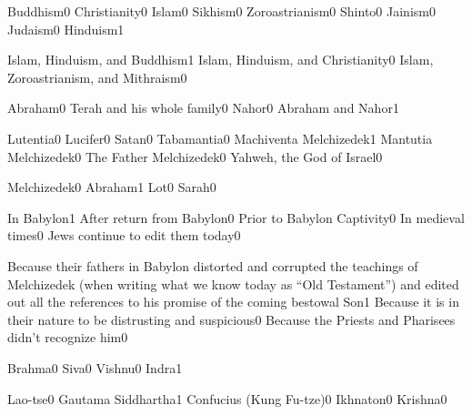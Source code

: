 {Buddhism}{0}
{Christianity}{0}
{Islam}{0}
{Sikhism}{0}
{Zoroastrianism}{0}
{Shinto}{0}
{Jainism}{0}
{Judaism}{0}
{Hinduism}{1}
\qstop

{Islam, Hinduism, and Buddhism}{1}
{Islam, Hinduism, and Christianity}{0}
{Islam, Zoroastrianism, and Mithraism}{0}
\qstop


{Abraham}{0}
{Terah and his whole family}{0}
{Nahor}{0}
{Abraham and Nahor}{1}
\qstop

{Lutentia}{0}
{Lucifer}{0}
{Satan}{0}
{Tabamantia}{0}
{Machiventa Melchizedek}{1}
{Mantutia Melchizedek}{0}
{The Father Melchizedek}{0}
{Yahweh, the God of Israel}{0}
\qstop

{Melchizedek}{0}
{Abraham}{1}
{Lot}{0}
{Sarah}{0}
\qstop

{In Babylon}{1}
{After return from Babylon}{0}
{Prior to Babylon Captivity}{0}
{In medieval times}{0}
{Jews continue to edit them today}{0}
\qstop

{Because their fathers in Babylon distorted and corrupted the teachings of Melchizedek (when writing what we know today as ``Old Testament'') and edited out all the references to his promise of the coming bestowal Son}{1}
{Because it is in their nature to be distrusting and suspicious}{0}
{Because the Priests and Pharisees didn't recognize him}{0}
\qstop


{Brahma}{0}
{Siva}{0}
{Vishnu}{0}
{Indra}{1}
\qstop

{Lao-tse}{0}
{Gautama Siddhartha}{1}
{Confucius (Kung Fu-tze)}{0}
{Ikhnaton}{0}
{Krishna}{0}
\qstop

